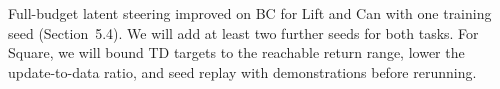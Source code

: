 Full-budget latent steering improved on BC for Lift and Can with one training
seed (Section~5.4). We will add at least two further seeds for both tasks. For
Square, we will bound TD targets to the reachable return range, lower the
update-to-data ratio, and seed replay with demonstrations before rerunning.


